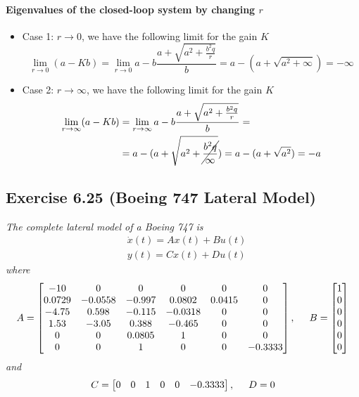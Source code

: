 \paragraph{Eigenvalues of the closed-loop system by changing $r$}
\begin{itemize}
    \item Case 1: $r \to 0$, we have the following limit for the gain $K$
    \begin{equation}
        \lim_{r \to 0} (a - Kb) = \lim_{r \to 0} a -  b \frac{a  + \sqrt{a^2 + \frac{b^2 q}{r}}}{b} = a - (a + \sqrt{a^2 +\infty}) = - \infty
    \end{equation}
    \item Case 2: $r \to \infty$, we have the following limit for the gain $K$
    \begin{align}
        \lim_{r \to \infty} (a - Kb) &= \lim_{r \to \infty} a -  b \frac{a  + \sqrt{a^2 + \frac{b^2 q}{r}}}{b} =\\ 
        &=a - (a + \sqrt{a^2 + \cancel{\frac{b^2 q}{\infty}}}) =  a - (a +\sqrt{a^2}) = -a 
    \end{align}
\end{itemize}

\subsection{Exercise 6.25 (Boeing 747 Lateral Model)}
\emph{The complete lateral model of a Boeing 747 is}
\begin{align}
    &\Dot{x}(t) = Ax(t) + Bu(t) \\
    &y(t) = Cx(t) + Du(t)
\end{align}
\emph{where}
\begin{equation}
A = 
    \begin{bmatrix}
        -10 & 0 & 0 & 0 & 0 & 0 \\
        0.0729 & -0.0558 & -0.997 & 0.0802 & 0.0415 & 0 \\
        -4.75 & 0.598 & -0.115 & -0.0318 & 0 & 0 \\
        1.53 & -3.05 & 0.388 & -0.465 & 0 & 0 \\
        0 & 0 & 0.0805 & 1 & 0 & 0 \\
        0 & 0 & 1 & 0 & 0 & -0.3333 \\
    \end{bmatrix}
    , \hspace{0.5cm} B =
    \begin{bmatrix}
        1\\ 0\\ 0\\ 0\\ 0\\ 0\\
    \end{bmatrix}
\end{equation}
\emph{and}
\begin{equation}
    C =
    \begin{bmatrix}
        0 & 0 & 1 & 0 & 0 & -0.3333
    \end{bmatrix}
    , \hspace{0.5cm} D=0
\end{equation}

